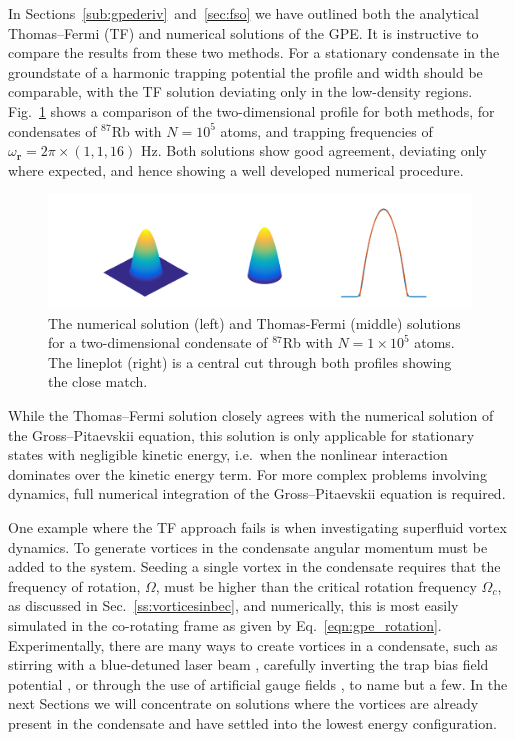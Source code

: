 In Sections~\ref{sub:gpederiv}~and~\ref{sec:fso} we have outlined both the analytical Thomas--Fermi (TF) and numerical solutions of the GPE. It is instructive to compare the results from these two methods. For a stationary condensate in the groundstate of a harmonic trapping potential the profile and width should be comparable, with the TF solution deviating only in the low-density regions. Fig.~\ref{fig:gpe_tf_3} shows a comparison of the two-dimensional profile for both methods, for condensates of $^{87}$Rb with $N=10^{5}$ atoms, and trapping frequencies of $\omega_{\mathbf{r}}=2\pi\times (1, 1, 16 )$ Hz. Both solutions show good agreement, deviating only where expected, and hence showing a well developed numerical procedure.
\begin{figure}\centering
    \includegraphics[width=\textwidth,trim=0ex 0ex 0ex 0ex]{Images/ch4_vtx/gpe_tf_3.pdf}
    \caption{The numerical solution (left) and Thomas-Fermi (middle) solutions for a two-dimensional condensate of $^{87}$Rb with $N=1\times 10^5$ atoms. The lineplot (right) is a central cut through both profiles showing the close match.}\label{fig:gpe_tf_3}
\end{figure}

While the Thomas--Fermi solution closely agrees with the numerical solution of the Gross--Pitaevskii equation, this solution is only applicable for stationary states with negligible kinetic energy, i.e.~when the nonlinear interaction dominates over the kinetic energy term. For more complex problems involving dynamics, full numerical integration of the Gross--Pitaevskii equation is required.

One example where the TF approach fails is when investigating superfluid vortex dynamics. To generate vortices in the condensate angular momentum must be added to the system. Seeding a single vortex in the condensate requires that the frequency of rotation, $\Omega$, must be higher than the critical rotation frequency $\Omega_c$, as discussed in Sec.~\ref{ss:vorticesinbec}, and numerically, this is most easily simulated in the co-rotating frame as given by Eq.~\eqref{eqn:gpe_rotation}. Experimentally, there are many ways to create vortices in a condensate, such as stirring with a blue-detuned laser beam \cite{Vtx:Raman_prl_2001}, carefully inverting the trap bias field potential \cite{VTX:Kawaguchi_pra_2004_2,VTX:Masuda_pra_2016}, or through the use of artificial gauge fields \cite{AO:Dalibard_rmp_2011}, to name but a few. In the next Sections we will concentrate on solutions where the vortices are already present in the condensate and have settled into the lowest energy configuration.


